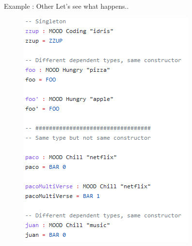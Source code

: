 \documentclass{beamer}
\newcommand{\othertitle}{Example : Other}
\begin{document}
\begin{frame}[fragile]{\othertitle}
Let's see what happens..
\begin{figure}
  \includegraphics[scale=0.56]{pics/random-code-2}
\end{figure}
\end{frame}
\end{document}
